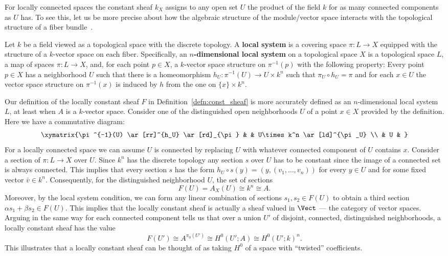 For locally connected spaces the constant sheaf $k_X$ assigns to any open set $U$ the product of the field $k$ for as many connected components as $U$ has. To see this, let us be more precise about how the algebraic structure of the module/vector space interacts with the topological structure of a fiber bundle~\cite[Sec. 7.2.1]{macpherson-ih-notes}.

\begin{defn}\label{defn:local_systems}
Let $k$ be a field viewed as a topological space with the discrete topology. 
A \textbf{local system} is a covering space $\pi:L\to X$ equipped with the structure of a $k$-vector space on each fiber. Specifically, an \textbf{$n$-dimensional local system} on a topological space $X$ is a topological space $L$, a map of spaces $\pi:L\to X$, and, for each point $p\in X$, a $k$-vector space structure on $\pi^{-1}(p)$ with the following property: Every point $p\in X$ has a neighborhood $U$ such that there is a homeomorphism $h_U:\pi^{-1}(U)\to U\times k^n$ such that $\pi_U\circ h_U=\pi$ and for each $x\in U$ the vector space structure on $\pi^{-1}(x)$ is induced by $h$ from the one on $\{x\}\times k^n$.
\end{defn}

Our definition of the locally constant sheaf $F$ in Definition~\ref{defn:const_sheaf} is more accurately defined as an $n$-dimensional local system $L$, at least when $A$ is a $k$-vector space. Consider one of the distinguished open neighborhoods $U$ of a point $x\in X$ provided by the definition. Here we have a commutative diagram:
\[
\xymatrix{\pi^{-1}(U) \ar[rr]^{h_U} \ar[rd]_{\pi} & & U\times k^n \ar[ld]^{\pi_U} \\ & U & } 
\]
For a locally connected space we can assume $U$ is connected by replacing $U$ with whatever connected component of $U$ contains $x$. Consider a section of $\pi:L\to X$ over $U$. Since $k^n$ has the discrete topology any section $s$ over $U$ has to be constant since the image of a connected set is always connected. This implies that every section $s$ has the form $h_U\circ s(y)=(y,(v_1,\ldots,v_n))$ for every $y\in U$ and for some fixed vector $\bar{v} \in k^n$. Consequently, for the distinguished neighborhood $U$, the set of sections
\[
F(U)=A_X(U)\cong k^n\cong A.
\]
Moreover, by the local system condition, we can form any linear combination of sections $s_1,s_2\in F(U)$ to obtain a third section $\alpha s_1+\beta s_2\in F(U)$. This implies that the locally constant sheaf is actually a sheaf valued in $\Vect$ --- the category of vector spaces. Arguing in the same way for each connected component tells us that over a union $U'$ of disjoint, connected, distinguished neighborhoods, a locally constant sheaf has the value
\[
F(U')\cong A^{\pi_0(U')} \cong H^0(U';A)\cong H^0(U';k)^n.
\]
This illustrates that a locally constant sheaf can be thought of as taking $H^0$ of a space with ``twisted'' coefficients.


